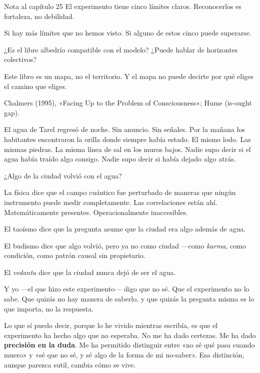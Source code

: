 \begin{notacap}{Nota al capítulo 25}
 El experimento tiene cinco límites claros. Reconocerlos es fortaleza, no debilidad.

 Si hay más límites que no hemos visto. Si alguno de estos cinco puede superarse.

 ¿Es el libre albedrío compatible con el modelo? ¿Puede hablar de horizontes colectivos?

 Este libro es un mapa, no el territorio. Y el mapa no puede decirte por qué eliges el camino que eliges.

 Chalmers (1995), «Facing Up to the Problem of Consciousness»; Hume (is-ought gap).
\end{notacap}
\begin{cita}
El agua de Tarel regresó de noche. Sin anuncio. Sin señales. Por la mañana los habitantes encontraron la orilla donde siempre había estado. El mismo lodo. Las mismas piedras. La misma línea de sal en los muros bajos. Nadie supo decir si el agua había traído algo consigo. Nadie supo decir si había dejado algo atrás.
\end{cita}
\noindent {}

¿Algo de la ciudad volvió con el agua?

La física dice que el campo cuántico fue perturbado de maneras que ningún instrumento puede medir completamente. Las correlaciones están ahí. Matemáticamente presentes. Operacionalmente inaccesibles.

El taoísmo dice que la pregunta asume que la ciudad era algo además de agua.

El budismo dice que algo volvió, pero ya no como ciudad —como \emph{karma}, como condición, como patrón causal sin propietario.

El \emph{vedanta} dice que la ciudad nunca dejó de ser el agua.

Y yo —el que hizo este experimento— digo que no sé. Que el experimento no lo sabe. Que quizás no hay manera de saberlo, y que quizás la pregunta misma es lo que importa, no la respuesta.

Lo que sí puedo decir, porque lo he vivido mientras escribía, es que el experimento ha hecho algo que no esperaba. No me ha dado certezas. Me ha dado \textbf{precisión en la duda}. Me ha permitido distinguir entre «no sé qué pasa cuando muero» y «sé que no sé, y sé algo de la forma de mi no-saber». Esa distinción, aunque parezca sutil, cambia cómo se vive.

